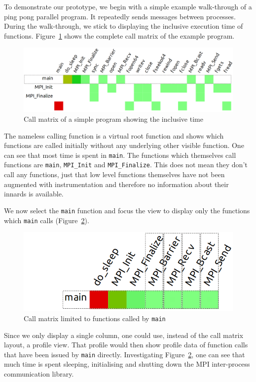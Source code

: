 \documentclass[b5paper, final, hauptseminar]{zih-template}
\begin{document}
To demonstrate our prototype, we begin with a simple example walk-through of a ping pong parallel program.
It repeatedly sends messages between processes.
During the walk-through, we stick to displaying the inclusive execution time of functions.
Figure~\ref{fig:id-m-pp-1-1} shows the complete call matrix of the example program.
\begin{figure}[htbp]
	\centering
	\includegraphics[width=0.8\linewidth]{id-m-pp-1-1}
	\caption{Call matrix of a simple program showing the inclusive time}
	\label{fig:id-m-pp-1-1}
\end{figure}
The nameless calling function is a virtual root function and shows which functions are called initially without any underlying other visible function.
One can see that most time is spent in \texttt{main}.
The functions which themselves call functions are \texttt{main}, \texttt{MPI\_Init} and \texttt{MPI\_Finalize}. This does not mean they don't call any functions, just that low level functions themselves have not been augmented with instrumentation and therefore no information about their innards is available.

We now select the \texttt{main} function and focus the view to display only the functions which \texttt{main} calls (Figure~\ref{fig:id-m-pp-1-2}).
\begin{figure}[htbp]
	\centering
	\includegraphics[width=0.5\linewidth]{id-m-pp-1-2}
	\caption{Call matrix limited to functions called by \texttt{main}}
	\label{fig:id-m-pp-1-2}
\end{figure}
Since we only display a single column, one could use, instead of the call matrix layout, a profile view.
That profile would then show profile data of function calls that have been issued by \texttt{main} directly.
Investigating Figure~\ref{fig:id-m-pp-1-2}, one can see that much time is spent sleeping, initialising and shutting down the MPI inter-process communication library.
\end{document}
